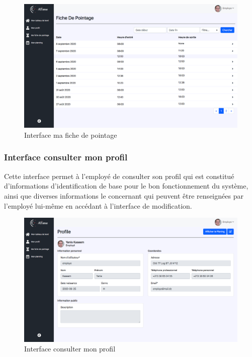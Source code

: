                 \begin{figure}[h!]
                            \vspace{-10pt}
                             \centering
                                \includegraphics[scale=0.306 ]{images/interface/fiche_pointage.png}
                             \caption{Interface ma fiche de pointage}
                             \label{fig93}
                \end{figure}
            \vspace{-10pt}   
            \subsubsection*{Interface consulter mon profil}
            Cette interface permet à l’employé de consulter son profil qui est constitué d’informations d'identification de base pour le bon fonctionnement du système, ainsi que diverses informations le concernant qui peuvent être renseignées par l’employé lui-même en accédant à l’interface de modification.
            
                \begin{figure}[h!]
                             \centering
                                \includegraphics[scale=0.306 ]{images/interface/mon_profil.png}
                             \caption{Interface consulter mon profil}
                             \label{fig94}
                \end{figure}
            
